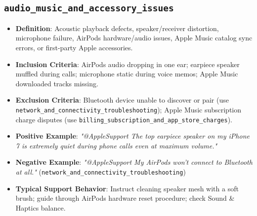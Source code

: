 \documentclass[11pt,a4paper]{article}
\begin{document}
\subsection{\texttt{audio\_music\_and\_accessory\_issues}}
\begin{itemize}[leftmargin=*]
    \item \textbf{Definition}: Acoustic playback defects, speaker/receiver distortion, microphone failure, AirPods hardware/audio issues, Apple Music catalog sync errors, or first-party Apple accessories.
    \item \textbf{Inclusion Criteria}: AirPods audio dropping in one ear; earpiece speaker muffled during calls; microphone static during voice memos; Apple Music downloaded tracks missing.
    \item \textbf{Exclusion Criteria}: Bluetooth device unable to discover or pair (use \texttt{network\_and\_connectivity\_troubleshooting}); Apple Music subscription charge disputes (use \texttt{billing\_subscription\_and\_app\_store\_charges}).
    \item \textbf{Positive Example}: \textit{"@AppleSupport The top earpiece speaker on my iPhone 7 is extremely quiet during phone calls even at maximum volume."}
    \item \textbf{Negative Example}: \textit{"@AppleSupport My AirPods won't connect to Bluetooth at all."} (\texttt{network\_and\_connectivity\_troubleshooting})
    \item \textbf{Typical Support Behavior}: Instruct cleaning speaker mesh with a soft brush; guide through AirPods hardware reset procedure; check Sound \& Haptics balance.
\end{itemize}
\end{document}
